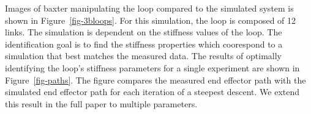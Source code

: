 \documentclass[runningheads,a4paper]{llncs}
\begin{document}
Images of baxter manipulating the loop compared to the simulated system is shown in Figure~\ref{fig-3bloops}.  For this simulation, the loop is composed of 12 links.  The simulation is dependent on the stiffness values of the loop.  The identification goal is to find the stiffness properties which coorespond to a simulation that best matches the measured data.  The results of optimally identifying the loop's stiffness parameters for a single experiment are shown in Figure~\ref{fig-paths}.  The figure compares the measured end effector path with the simulated end effector path for each iteration of a steepest descent.  We extend this result in the full paper to multiple parameters.





\end{document}
